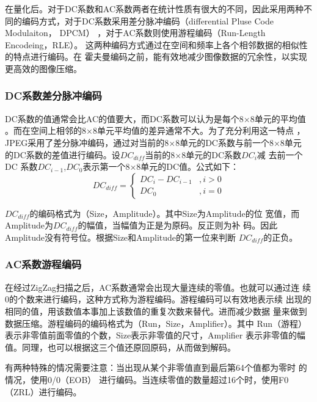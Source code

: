 \documentclass{article}
\numberwithin {equation}{section}
\begin{document}
\begin{spacing}{1.25}
    在量化后。对于DC系数和AC系数两者在统计性质有很大的不同，因此采用两种不
    同的编码方式，对于DC系数采用差分脉冲编码（differential Pluse Code Modulaiton， DPCM）
    ，对于AC系数则使用游程编码（Run-Length Encodeing，RLE）。
    这两种编码方式通过在空间和频率上各个相邻数据的相似性的特点进行编码。在
    霍夫曼编码之前，能有效地减少图像数据的冗余性，以实现更高效的图像压缩。
    \subsubsection{DC系数差分脉冲编码}
    \vspace{1em}
      DC系数的值通常会比AC的值要大，而DC系数可以认为是每个8×8单元的平均值
      。而在空间上相邻的8×8单元平均值的差异通常不大。为了充分利用这一特点
      ，JPEG采用了差分脉冲编码，通过对当前的8×8单元的DC系数与前一个8×8单元
      的DC系数的差值进行编码。设$DC_{diff}$当前的8×8单元的DC系数$DC_{i}$减
      去前一个DC
      系数$DC_{i-1}$,$DC_{0}$表示第一个8×8单元的DC值。公式如下：
      \begin{equation}
        DC_{diff}=\begin{cases}
          DC_{i}-DC_{i-1} &,i>0\\
          DC_{0}&,i=0
        \end{cases}
      \end{equation}

      $DC_{diff}$的编码格式为（Size，Amplitude）。其中Size为Amplitude的位
      宽值，而Amplitude为$DC_{diff}$的幅值，当幅值为正是为原码。反正则为补
      码。因此Amplitude没有符号位。根据Size和Amplitude的第一位来判断
      $DC_{diff}$的正负。
    \subsubsection{AC系数游程编码}
      \vspace{1em}
      在经过ZigZag扫描之后，AC系数通常会出现大量连续的零值。也就可以通过连
      续0的个数来进行编码，这种方式称为游程编码。游程编码可以有效地表示续
      出现的相同的值，用该数值本事加上该数值的重复次数来替代。进而减少数据
      量来做到数据压缩。游程编码的编码格式为（Run，Size，Amplifier）。其中
      Run（游程）表示非零值前面零值的个数，Size表示非零值的尺寸，Amplifier
      表示非零值的幅值。同理，也可以根据这三个值还原回原码，从而做到解码。

      有两种特殊的情况需要注意：当出现从某个非零值直到最后第64个值都为零时
      的情况，使用0/0（EOB）
      进行编码。当连续零值的数量超过16个时，使用F0（ZRL）进行编码。

\end{spacing}
\end{document}
